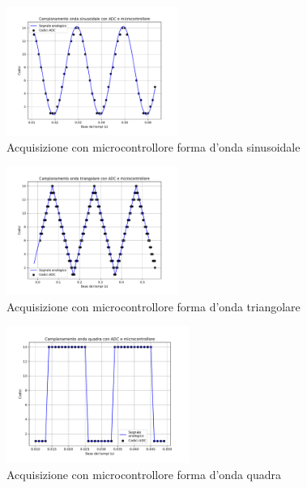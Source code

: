 \documentclass[journal]{IEEEtran}
\begin{document}
\begin{figure}[H]%
\begin{center}
\includegraphics[trim = {0 25 0 0},clip, width=0.50\textwidth]{analysis/output/mcu_sine.pdf}
\caption{Acquisizione con microcontrollore forma d'onda sinusoidale}
\label{fig:mcu_sine}
\end{center}
\end{figure}

\begin{figure}[H]%
\begin{center}
\includegraphics[trim = {0 25 0 0},clip, width=0.50\textwidth]{analysis/output/mcu_triangle.pdf}
\caption{Acquisizione con microcontrollore forma d'onda triangolare}
\label{fig:mcu_triang}
\end{center}
\end{figure}

\begin{figure}[H]%
\begin{center}
\includegraphics[trim = {0 25 0 0},clip, width=0.53\textwidth]{analysis/output/mcu_square.pdf}
\caption{Acquisizione con microcontrollore forma d'onda quadra}
\label{fig:mcu_square}
\end{center}
\end{figure}
\end{document}
